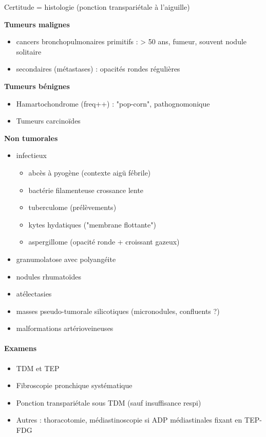 \documentclass[11pt]{article}
\begin{document}
Certitude = histologie (ponction transpariétale à l'aiguille)

\textbf{Tumeurs malignes}  

\begin{itemize}
\item cancers bronchopulmonaires primitifs : > 50 ans, fumeur, souvent nodule
solitaire
\item secondaires (métastases) : opacités rondes régulières
\end{itemize}


\textbf{Tumeurs bénignes} 

\begin{itemize}
\item Hamartochondrome (freq++) : "pop-corn", pathognomonique
\item Tumeurs  carcinoïdes
\end{itemize}


\textbf{Non tumorales}

\begin{itemize}
\item infectieux 

\begin{itemize}
\item abcès à pyogène (contexte aigü fébrile)
\item bactérie filamenteuse crossance lente
\item tuberculome (\thus prélèvements)
\item kytes hydatiques ("membrane flottante")
\item aspergillome (opacité ronde + croissant gazeux)
\end{itemize}

\item granumolatose avec polyangéite
\item nodules rhumatoïdes
\item atélectasies
\item masses pseudo-tumorale silicotiques (micronodules, confluents ?)
\item malformations artérioveineuses
\end{itemize}


\paragraph{Examens}
\label{sec:orgb3239d0}

\begin{itemize}
\item TDM et TEP
\item Fibroscopie pronchique systématique
\item Ponction transpariétale sous TDM (sauf insuffisance respi)
\item Autres : thoracotomie, médiastinoscopie si ADP médiastinales fixant en TEP-FDG
\end{itemize}
\end{document}
